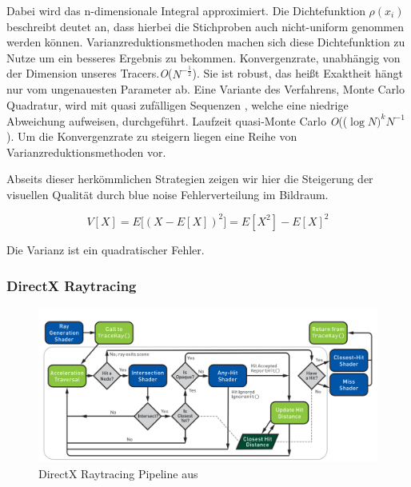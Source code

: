 Dabei wird das n-dimensionale Integral approximiert. Die Dichtefunktion $\rho(x_i)$ 
beschreibt deutet an, dass hierbei die Stichproben auch nicht-uniform 
genommen werden können. Varianzreduktionsmethoden machen sich diese Dichtefunktion zu Nutze um 
ein besseres Ergebnis zu bekommen.
\cite{caflisch_1998}
Konvergenzrate, unabhängig von der Dimension unseres Tracers.\textit{O}($N^{-\frac{1}{2}}$).
Sie ist robust, das heißt Exaktheit hängt nur vom ungenauesten Parameter ab. Eine Variante des Verfahrens, 
Monte Carlo Quadratur, wird mit quasi zufälligen Sequenzen , 
welche eine niedrige Abweichung aufweisen, durchgeführt. Laufzeit quasi-Monte Carlo \textit{O}(($\log N)^{k}N^{-1}$).
Um die Konvergenzrate zu steigern liegen eine Reihe von Varianzreduktionsmethoden vor.

Abseits dieser herkömmlichen Strategien zeigen wir hier die Steigerung der 
visuellen Qualität durch blue noise Fehlerverteilung im Bildraum.

\begin{equation}\label{eq:Monte-Carlo-Varianz}
    V[X] = E\biggl[(X-E[X])^{2}\biggl] = E[X^{2}]
    - E[X]^{2}
\end{equation}

Die Varianz  ist ein quadratischer Fehler.

\subsubsection{DirectX Raytracing}

\begin{figure}[H]
    \centering
    \includegraphics[width=\linewidth]{content/PathTracer/Bilder/DirectXRaytracingPipeline.png}
    \caption{DirectX Raytracing Pipeline aus \cite{Haines2019}}
    \label{pic:DirectXRaytracingPipeline}
\end{figure}

